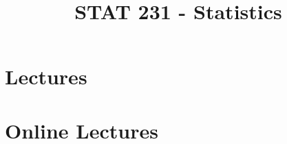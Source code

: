 
\title{STAT 231 - Statistics}


\maketitle

\tableofcontents

\newpage

\chapter{Lectures}






















\chapter{Online Lectures}
















